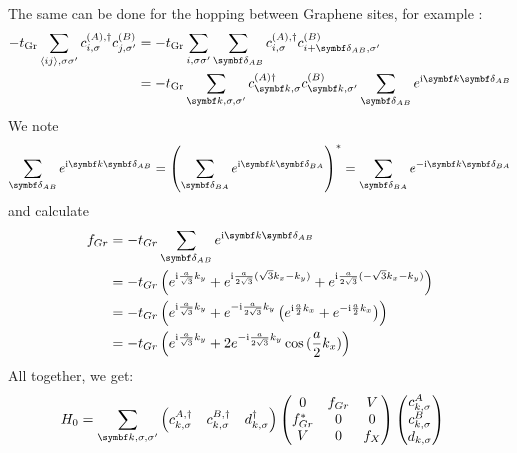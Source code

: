 \documentclass[../main.tex]{subfiles}
\begin{document}
	The same can be done for the hopping between Graphene sites, for example :
	\begin{align}
		-t_{\mathrm{Gr}} \sum_{\langle ij \rangle, \sigma \sigma^{\prime}} c_{i, \sigma}^{(A), \dagger} c_{j, \sigma^{\prime}}^{(B)}
		&= -t_{\mathrm{Gr}} \sum_{i, \sigma \sigma^{\prime}} \sum_{\vb{\delta}_{AB}} c_{i, \sigma}^{(A), \dagger} c_{i + \vb{\delta}_{AB} , \sigma^{\prime}}^{(B)} \\
		&= -t_{\mathrm{Gr}} \sum_{\vb{k}, \sigma, \sigma^{\prime}}  c_{\vb{k}, \sigma}^{(A) \dagger} c_{\vb{k}, \sigma^{\prime}}^{(B)} \sum_{\vb{\delta}_{AB}} e^{\iu \vb{k} \vb{\delta}_{AB}}
	\end{align}
	We note 
	\begin{align}
		\sum_{\vb{\delta}_{AB}} e^{\iu \vb{k} \vb{\delta}_{AB}} = \left( \sum_{\vb{\delta}_{BA}} e^{\iu \vb{k} \vb{\delta}_{BA}} \right)^* = \sum_{\vb{\delta}_{BA}} e^{-\iu \vb{k} \vb{\delta}_{BA}}
	\end{align}
	and calculate
	\begin{align}
		f_{Gr} &= -t_{Gr} \sum_{\vb{\delta}_{AB}} e^{\iu \vb{k} \vb{\delta}_{AB}} \\
		&= -t_{Gr} \left(
		e^{\iu \frac{a}{\sqrt{3}} k_y} +
		e^{\iu \frac{a}{2\sqrt{3}} (\sqrt{3} k_x - k_y)} +
		e^{\iu \frac{a}{2\sqrt{3}} (-\sqrt{3} k_x - k_y)} \right) \\
		&= -t_{Gr} \left(
		e^{\iu \frac{a}{\sqrt{3}} k_y} +
		e^{-\iu \frac{a}{2\sqrt{3}} k_y} \left(
		e^{\iu \frac{a}{2} k_x} + e^{-\iu \frac{a}{2} k_x}
		\right) \right) \\
		&= -t_{Gr} \left(
		e^{\iu \frac{a}{\sqrt{3}} k_y} +
		2 e^{-\iu \frac{a}{2\sqrt{3}} k_y}
		\cos{(\frac{a}{2} k_x)} \right)
	\end{align}
	All together, we get:
	\begin{align}
		H_0 &= \sum_{\vb{k}, \sigma, \sigma^{\prime}} \begin{pmatrix} c_{k, \sigma}^{A, \dagger} & c_{k, \sigma}^{B, \dagger} & d_{k, \sigma}^{\dagger} \end{pmatrix}
		\begin{pmatrix}
			0 & f_{Gr} & V \\
			f_{Gr}^* & 0 & 0 \\
			V & 0 & f_{X}
		\end{pmatrix} \begin{pmatrix} c_{k, \sigma}^{A} \\ c_{k, \sigma}^{B} \\ d_{k, \sigma} \end{pmatrix}
		\label{eq:EG-X Hamiltonian non-interacting matrix appendix}
	\end{align}
\end{document}
